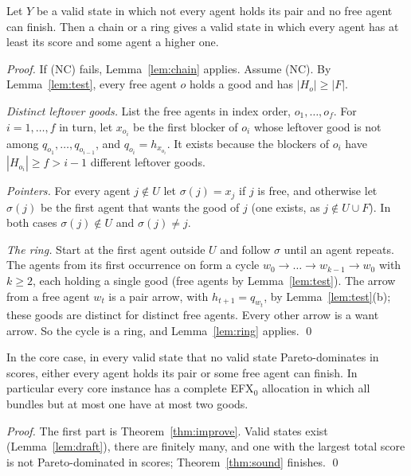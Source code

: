 \documentclass[runningheads,11pt]{llncs}
\newcommand{\efxz}{\texorpdfstring{\mbox{EFX$_0$}}{EFX0}}
\begin{document}
\begin{theorem}\label{thm:improve}
Let $Y$ be a valid state in which not every agent holds its pair and no free agent can finish. Then a chain or a ring gives a valid state in which every agent has at least its score and some agent a higher one.
\end{theorem}

\begin{proof}
If (NC) fails, Lemma~\ref{lem:chain} applies. Assume (NC). By Lemma~\ref{lem:test}, every free agent $o$ holds a good and has $|H_o|\ge|F|$.

\emph{Distinct leftover goods.} List the free agents in index order, $o_1,\dots,o_f$. For $i=1,\dots,f$ in turn, let $x_{o_i}$ be the first blocker of $o_i$ whose leftover good is not among $q_{o_1},\dots,q_{o_{i-1}}$, and $q_{o_i}=h_{x_{o_i}}$. It exists because the blockers of $o_i$ have $|H_{o_i}|\ge f>i-1$ different leftover goods.

\emph{Pointers.} For every agent $j\notin U$ let $\sigma(j)=x_j$ if $j$ is free, and otherwise let $\sigma(j)$ be the first agent that wants the good of $j$ (one exists, as $j\notin U\cup F$). In both cases $\sigma(j)\notin U$ and $\sigma(j)\ne j$.

\emph{The ring.} Start at the first agent outside $U$ and follow $\sigma$ until an agent repeats. The agents from its first occurrence on form a cycle $w_0\to\dots\to w_{k-1}\to w_0$ with $k\ge2$, each holding a single good (free agents by Lemma~\ref{lem:test}). The arrow from a free agent $w_t$ is a pair arrow, with $h_{t+1}=q_{w_t}$, by Lemma~\ref{lem:test}(b); these goods are distinct for distinct free agents. Every other arrow is a want arrow. So the cycle is a ring, and Lemma~\ref{lem:ring} applies. \qed
\end{proof}

\begin{corollary}\label{cor:po}
In the core case, in every valid state that no valid state Pareto-dominates in scores, either every agent holds its pair or some free agent can finish. In particular every core instance has a complete \efxz{} allocation in which all bundles but at most one have at most two goods.
\end{corollary}

\begin{proof}
The first part is Theorem~\ref{thm:improve}. Valid states exist (Lemma~\ref{lem:draft}), there are finitely many, and one with the largest total score is not Pareto-dominated in scores; Theorem~\ref{thm:sound} finishes. \qed
\end{proof}
\end{document}
